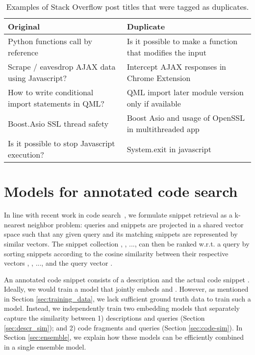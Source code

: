 \documentclass[12pt,conference, onecolumn]{IEEEtran}
\begin{document}
\begin{table}[]
\small
\centering
\begin{tabular}{@{}ll@{}}
\toprule
\normalsize{\textbf{Original}}                                   & \normalsize{ \textbf{Duplicate}}                                                      \\ \midrule

Python functions call by reference                  & Is it possible to make a function that modifies the input               \\
Scrape / eavesdrop AJAX data using Javascript?      & Intercept AJAX responses in Chrome Extension                            \\
How to write conditional import statements in QML?  & QML import later module version only if available                       \\
Boost.Asio SSL thread safety                        & Boost Asio and usage of OpenSSL in multithreaded app                    \\
Is it possible to stop Javascript execution?        & System.exit in javascript  \\                      
\bottomrule                      
\end{tabular}
\caption{Examples of Stack Overflow post titles that were tagged as duplicates.}
\label{tab:so_duplicates}
\end{table}  
\section{Models for annotated code search}\label{sec:retrieval_model}
In line with recent work in code search~\cite{gu2018deep, sachdev2018retrieval, cambronero2019deep, husain2019codesearchnet, yao2019coacor}, we formulate snippet retrieval as a k-nearest neighbor problem: queries and snippets are projected in a shared vector space such that any given query and its matching snippets are represented by similar vectors. The snippet collection , , ...,   can then be ranked w.r.t. a query  by sorting snippets according to the cosine similarity between their respective vectors , , ...,  and the query vector .
 
 

An annotated code snippet  consists of a description  and the actual code snippet . Ideally, we would train a model that jointly embeds  and . However, as mentioned in Section \ref{sec:training_data}, we lack sufficient ground truth data to train such a model. Instead, we independently train two embedding models that separately capture the similarity between 1) descriptions and queries (Section \ref{sec:descr_sim}); and 2) code fragments and queries (Section \ref{sec:code-sim}). In Section \ref{sec:ensemble}, we explain how these models can be efficiently combined in a single ensemble model.
\end{document}
